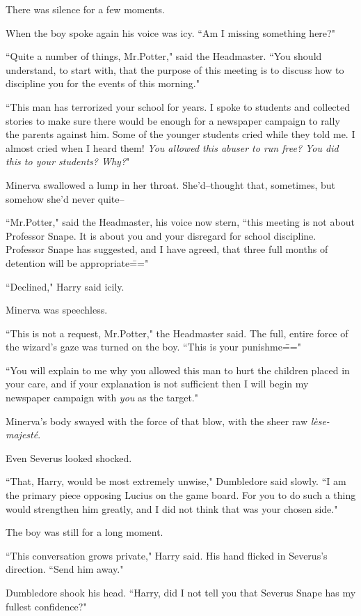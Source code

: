 There was silence for a few moments.

When the boy spoke again his voice was icy. ``Am I missing something here?"

``Quite a number of things, Mr.\?Potter," said the Headmaster. ``You should understand, to start with, that the purpose of this meeting is to discuss how to discipline you for the events of this morning."

``This man has terrorized your school for years. I spoke to students and collected stories to make sure there would be enough for a newspaper campaign to rally the parents against him. Some of the younger students cried while they told me. I almost cried when I heard them! \emph{You allowed this abuser to run free? You did this to your students? Why?}"

Minerva swallowed a lump in her throat. She'd\---thought that, sometimes, but somehow she'd never quite\---

``Mr.\?Potter," said the Headmaster, his voice now stern, ``this meeting is not about Professor Snape. It is about you and your disregard for school discipline. Professor Snape has suggested, and I have agreed, that three full months of detention will be appropriate\==="

``Declined," Harry said icily.

Minerva was speechless.

``This is not a request, Mr.\?Potter," the Headmaster said. The full, entire force of the wizard's gaze was turned on the boy. ``This is your punishme\==="

``You will explain to me why you allowed this man to hurt the children placed in your care, and if your explanation is not sufficient then I will begin my newspaper campaign with \emph{you} as the target."

Minerva's body swayed with the force of that blow, with the sheer raw \emph{lèse-majesté}.

Even Severus looked shocked.

``That, Harry, would be most extremely unwise," Dumbledore said slowly. ``I am the primary piece opposing Lucius on the game board. For you to do such a thing would strengthen him greatly, and I did not think that was your chosen side."

The boy was still for a long moment.

``This conversation grows private," Harry said. His hand flicked in Severus's direction. ``Send him away."

Dumbledore shook his head. ``Harry, did I not tell you that Severus Snape has my fullest confidence?"

